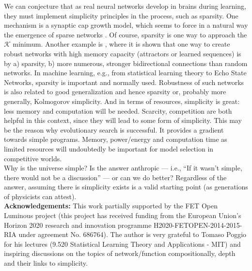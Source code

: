 \documentclass[11pt]{amsart}
\begin{document}
We can conjecture that as real neural networks develop in brains during learning, they must implement simplicity principles in the process, such as sparsity.  One mechanism is a synaptic cap growth model, which seems to force in a natural way the emergence of sparse networks \cite{Hahnloser:2002aa}. Of course, sparsity is one way to approach the $\mathcal K$  minimum. Another example is \cite{Brunel:2016aa}, where it is shown that one way to create robust networks with high memory capacity (attractors or learned sequences) is by a)  sparsity, b) more numerous, stronger bidirectional connections than random networks. In machine learning, e.g., from statistical learning theory to Echo State Networks, sparsity is important and normally used.  Robustness of such networks is also related to good generalization \cite{Bousquet:2002aa} and hence sparsity or, probably more generally, Kolmogorov simplicity.  And in terms of resources, simplicity is great: less memory and computation will be needed.  Scarcity, competition are both helpful in this context, since they will lead to some form of simplicity. This may be the reason why evolutionary search is successful. It provides a gradient towards simple programs. Memory, power/energy and computation time as limited resources will undoubtedly be important for model selection in competitive worlds.\\
 
Why is the universe simple? Is the answer anthropic --- i.e., ``If it wasn't simple, there would not be a discussion'' --- or can we do better?  Regardless of the answer, assuming there is simplicity exists is a valid starting point (as generations of physicists can attest). \\

{\bf Acknowledgements:} This work partially supported by the FET Open Luminous project (this project has received funding from the European Union's Horizon 2020 research and innovation programme H2020-FETOPEN-2014-2015-RIA under agreement No. 686764). The author is very grateful to Tomaso Poggio for his lectures (9.520 Statistical Learning Theory and Applications - MIT) and inspiring discussions on the topics of network/function compositionally, depth and their links to simplicity. 
\end{document}

